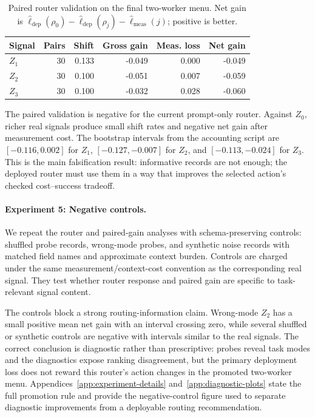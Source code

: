 \documentclass{article}
\begin{document}
\begin{table}[t]
\centering
\small
\caption{Paired router validation on the final two-worker menu.
Net gain is \(\widehat{\ell}_{\mathrm{dep}}(\rho_0)-\widehat{\ell}_{\mathrm{dep}}(\rho_j)-\widehat{\ell}_{\mathrm{meas}}(j)\); positive is better.}
\label{tab:twomodel-router-gain}
\begin{tabular}{@{}lrrrrr@{}}
\toprule
Signal & Pairs & Shift & Gross gain & Meas. loss & Net gain \\
\midrule
\(Z_1\) & 30 & 0.133 & -0.049 & 0.000 & -0.049 \\
\(Z_2\) & 30 & 0.100 & -0.051 & 0.007 & -0.059 \\
\(Z_3\) & 30 & 0.100 & -0.032 & 0.028 & -0.060 \\
\bottomrule
\end{tabular}
\end{table}

The paired validation is negative for the current prompt-only router.
Against \(Z_0\), richer real signals produce small shift rates and negative net gain after measurement cost.
The bootstrap intervals from the accounting script are \([-0.116,0.002]\) for \(Z_1\), \([-0.127,-0.007]\) for \(Z_2\), and \([-0.113,-0.024]\) for \(Z_3\).
This is the main falsification result: informative records are not enough; the deployed router must use them in a way that improves the selected action's checked cost--success tradeoff.

\paragraph{Experiment 5: Negative controls.}
We repeat the router and paired-gain analyses with schema-preserving controls: shuffled probe records, wrong-mode probes, and synthetic noise records with matched field names and approximate context burden.
Controls are charged under the same measurement/context-cost convention as the corresponding real signal.
They test whether router response and paired gain are specific to task-relevant signal content.

The controls block a strong routing-information claim.
Wrong-mode \(Z_2\) has a small positive mean net gain with an interval crossing zero, while several shuffled or synthetic controls are negative with intervals similar to the real signals.
The correct conclusion is diagnostic rather than prescriptive: probes reveal task modes and the diagnostics expose ranking disagreement, but the primary deployment loss does not reward this router's action changes in the promoted two-worker menu.
Appendices~\ref{app:experiment-details} and~\ref{app:diagnostic-plots} state the full promotion rule and provide the negative-control figure used to separate diagnostic improvements from a deployable routing recommendation.
\end{document}

